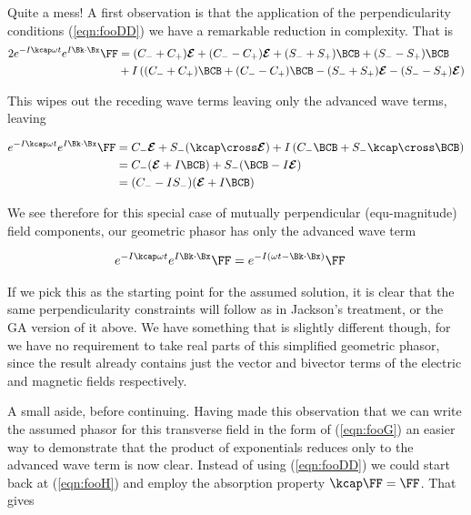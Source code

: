 Quite a mess!  A first observation is that the application of the perpendicularity conditions (\ref{eqn:fooDD}) we have a remarkable reduction in complexity.  That is
\begin{align*}
2 e^{ -I \kcap \omega t } e^{ I \Bk \cdot \Bx } \FF
&=
 (C_{-} + C_{+}) \EE 
+(C_{-} - C_{+}) \EE
+(S_{-} + S_{+}) \BCB
+(S_{-} - S_{+}) \BCB
\\
&+{I}
\left( 
 (C_{-} + C_{+}) \BCB
+(C_{-} - C_{+}) \BCB
-(S_{-} + S_{+}) \EE
-(S_{-} - S_{+}) \EE 
\right) \\
\end{align*}

This wipes out the receding wave terms leaving only the advanced wave terms, leaving

\begin{align*}
e^{ -I \kcap \omega t } e^{ I \Bk \cdot \Bx } \FF
&=
 C_{-} \EE 
+S_{-} (\kcap \cross \EE)
+{I}
\left( 
 C_{-} \BCB +S_{-} \kcap \cross \BCB 
\right) \\
&=
 C_{-} (\EE + I\BCB)
+S_{-} (\BCB -I\EE) \\
&=
( C_{-} -I S_{-} ) (\EE + I\BCB) \\
\end{align*}

We see therefore for this special case of mutually perpendicular (equ-magnitude) field components, our geometric phasor has only the advanced wave term

\begin{align}\label{eqn:fooG}
e^{ -I \kcap \omega t } e^{ I \Bk \cdot \Bx } \FF &= e^{-I(\omega t - \Bk \cdot \Bx)} \FF
\end{align}

If we pick this as the starting point for the assumed solution, it is clear that the same perpendicularity constraints will follow as in Jackson's treatment, or the GA version of it above.  We have something that is slightly different though, for we have no requirement to take real parts of this simplified geometric phasor, since the result already contains just the vector and bivector terms of the electric and magnetic fields respectively.

A small aside, before continuing.  Having made this observation that we can write the assumed phasor for this transverse field in the form of (\ref{eqn:fooG}) an easier way to demonstrate that the product of exponentials reduces only to the advanced wave term is now clear.  Instead of using (\ref{eqn:fooDD}) we could start back at (\ref{eqn:fooH}) and employ the absorption property $\kcap \FF = \FF$.  That gives

